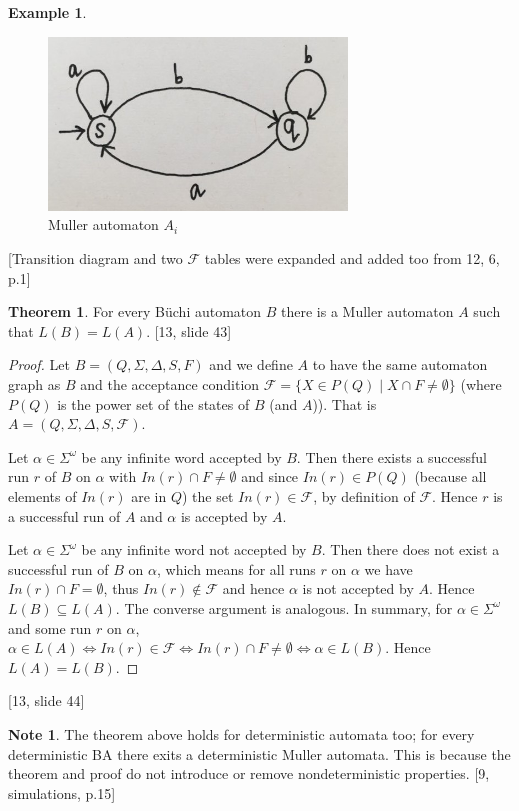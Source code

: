 \documentclass[a4paper,12pt]{report}
\theoremstyle{definition}
\newtheorem{exmp}{Example}[subsection]
\newtheorem{theorem}{Theorem}[chapter]
\newtheorem{note}{Note}[subsection]
\begin{document}
\begin{exmp}
\begin{figure}[ht]
\centering
\includegraphics[width=300px]{figure1.8.jpg}
\caption{Muller automaton $A_i$}
\label{image-Figure8}
\end{figure}
\end{exmp}
[Transition diagram and two $\mathcal{F}$ tables were expanded and added too from 12, 6, p.1]

\begin{theorem}
For every Büchi automaton $B$ there is a Muller automaton $A$ such that $L(B)=L(A)$. [13, slide 43]
\end{theorem}
\begin{proof}
Let $B=(Q,\Sigma,\Delta,S,F)$ and we define $A$ to have the same automaton graph as $B$ and the acceptance condition $\mathcal{F}=\{X\in P(Q) \mid X\cap F \neq\emptyset\}$ (where $P(Q)$ is the power set of the states of $B$ (and $A$)). That is $A=(Q,\Sigma,\Delta, S, \mathcal{F})$. 

Let $\alpha\in \Sigma^\omega$ be any infinite word accepted by $B$. Then there exists a successful run $r$ of $B$ on $\alpha$ with $In(r) \cap F\neq\emptyset$ and since $In(r)\in P(Q)$ (because all elements of $In(r)$ are in $Q$) the set $In(r)\in\mathcal{F}$, by definition of $\mathcal{F}$. Hence $r$ is a successful run of $A$ and $\alpha$ is accepted by $A$. 

Let $\alpha\in\Sigma^\omega$ be any infinite word not accepted by $B$.  Then there does not exist a successful run of $B$ on $\alpha$, which means for all runs $r$ on $\alpha$ we have $In(r)\cap F = \emptyset$, thus $In(r) \notin \mathcal{F} $ and hence $\alpha$ is not accepted by $A$. 
Hence $L(B)\subseteq L(A)$. The converse argument is analogous. In summary, for $\alpha\in\Sigma^\omega$ and some run $r$ on $\alpha$, 
$\alpha\in L(A)\iff In(r)\in \mathcal{F}\iff In(r) \cap F \neq\emptyset \iff \alpha\in L(B)$. 
Hence $L(A)=L(B)$.
\end{proof}
[13, slide 44]

\begin{note}
The theorem above holds for deterministic automata too; for every deterministic BA there exits a deterministic Muller automata. This is because the theorem and proof do not introduce or remove nondeterministic properties. [9, simulations, p.15]
\end{note}
\end{document}

